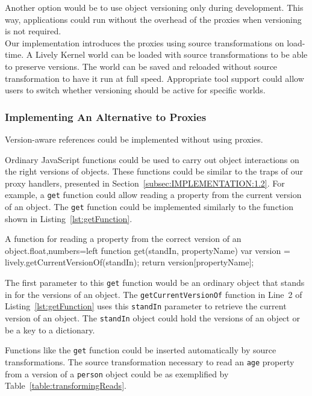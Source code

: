 Another option would be to use object versioning only during development.
This way, applications could run without the overhead of the proxies when versioning is not required.\\
Our implementation introduces the proxies using source transformations on load-time.
A Lively Kernel world can be loaded with source transformations to be able to preserve versions.
The world can be saved and reloaded without source transformation to have it run at full speed.
Appropriate tool support could allow users to switch whether versioning should be active for specific worlds.


\subsubsection{Implementing An Alternative to Proxies}

Version-aware references could be implemented without using proxies.

Ordinary JavaScript functions could be used to carry out object interactions on the right versions of objects.
These functions could be similar to the traps of our proxy handlers, presented in Section~\ref{subsec:IMPLEMENTATION:1.2}.
For example, a \lstinline{get} function could allow reading a property from the current version of an object.
The \lstinline{get} function could be implemented similarly to the function shown in Listing~\ref{lst:getFunction}.

\iffalse
\begin{verbatim}\fi
\begin{code}{A function for reading a property from the correct version of an object.}{float,numbers=left}
function get(standIn, propertyName) {
    var version = lively.getCurrentVersionOf(standIn);
    return version[propertyName];
}
\end{code}
\iffalse
\end{verbatim}\fi

The first parameter to this \lstinline{get} function would be an ordinary object that stands in for the versions of an object.
The \lstinline{getCurrentVersionOf} function in Line~2 of Listing~\ref{lst:getFunction} uses this \lstinline{standIn} parameter to retrieve the current version of an object.
The \lstinline{standIn} object could hold the versions of an object or be a key to a dictionary.

Functions like the \lstinline{get} function could be inserted automatically by source transformations.
The source transformation necessary to read an \lstinline{age} property from a version of a \lstinline{person} object could be as exemplified by Table~\ref{table:transformingReads}.

